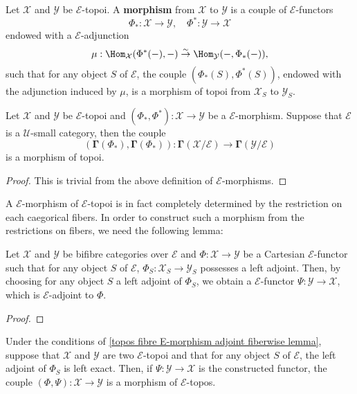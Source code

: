 \begin{definition}
Let $\mathcal{X}$ and $\mathcal{Y}$ be $\mathcal{E}$-topoi. A \textbf{morphism} from $\mathcal{X}$ to $\mathcal{Y}$ is a couple of $\mathcal{E}$-functors 
\[\Phi_*:\mathcal{X}\to\mathcal{Y},\quad \Phi^*:\mathcal{Y}\to\mathcal{X}\]
endowed with a $\mathcal{E}$-adjunction
\[\mu:\Hom_\mathcal{X}(\Phi^*(-),-) \stackrel{\sim}{\to } \Hom_\mathcal{Y}(-,\Phi_*(-)),\]
such that for any object $S$ of $\mathcal{E}$, the couple $(\Phi_*(S),\Phi^*(S))$, endowed with the adjunction induced by $\mu$, is a morphism of topoi from $\mathcal{X}_S$ to $\mathcal{Y}_S$. 
\end{definition}

\begin{proposition}\label{topos fibre E-morphism section is morphism}
Let $\mathcal{X}$ and $\mathcal{Y}$ be $\mathcal{E}$-topoi and $(\Phi_*,\Phi^*):\mathcal{X}\to\mathcal{Y}$ be a $\mathcal{E}$-morphism. Suppose that $\mathcal{E}$ is a $\mathscr{U}$-small category, then the couple
\[(\bm{\Gamma}(\Phi_*),\bm{\Gamma}(\Phi_*)):\bm{\Gamma}(\mathcal{X}/\mathcal{E})\to\bm{\Gamma}(\mathcal{Y}/\mathcal{E})\]
is a morphism of topoi.
\end{proposition}
\begin{proof}
This is trivial from the above definition of $\mathcal{E}$-morphisms.
\end{proof}
A $\mathcal{E}$-morphism of $\mathcal{E}$-topoi is in fact completely determined by the restriction on each caegorical fibers. In order to construct such a morphism from the restrictions on fibers, we need the following lemma:
\begin{lemma}\label{topos fibre E-morphism adjoint fiberwise lemma}
Let $\mathcal{X}$ and $\mathcal{Y}$ be bifibre categories over $\mathcal{E}$ and $\Phi:\mathcal{X}\to\mathcal{Y}$ be a Cartesian $\mathcal{E}$-functor such that for any object $S$ of $\mathcal{E}$, $\Phi_S:\mathcal{X}_S\to\mathcal{Y}_S$ possesses a left adjoint. Then, by choosing for any object $S$ a left adjoint of $\Phi_S$, we obtain a $\mathcal{E}$-functor $\Psi:\mathcal{Y}\to\mathcal{X}$, which is $\mathcal{E}$-adjoint to $\Phi$.
\end{lemma}
\begin{proof}

\end{proof}

\begin{remark}
Under the conditions of \cref{topos fibre E-morphism adjoint fiberwise lemma}, suppose that $\mathcal{X}$ and $\mathcal{Y}$ are two $\mathcal{E}$-topoi and that for any object $S$ of $\mathcal{E}$, the left adjoint of $\Phi_S$ is left exact. Then, if $\Psi:\mathcal{Y}\to\mathcal{X}$ is the constructed functor, the couple $(\Phi,\Psi):\mathcal{X}\to\mathcal{Y}$ is a morphism of $\mathcal{E}$-topos. 
\end{remark}

